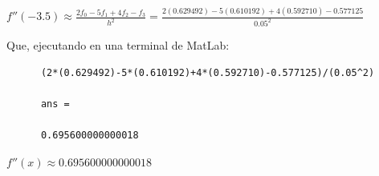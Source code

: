 \documentclass[english,notitlepage,letterpaper, 10pt]{article} %
\begin{document}
\begin{enumerate}
    \begin{center}
      \begin{math}
        f''(-3.5) \approx \displaystyle \frac{2f_0-5f_1+4f_2-f_3}{h^2} = \frac{2(0.629492)-5(0.610192)+4(0.592710)-0.577125}{0.05^2}
      \end{math}
    \end{center}

    Que, ejecutando en una terminal de MatLab:

    \begin{lstlisting}
      (2*(0.629492)-5*(0.610192)+4*(0.592710)-0.577125)/(0.05^2) 

      ans =
      
      0.695600000000018
    \end{lstlisting}
    
    \begin{center}
      \begin{math}
        f''(x) \approx  0.695600000000018
      \end{math}
    \end{center}

  \end{enumerate}
  
  
\end{document}
